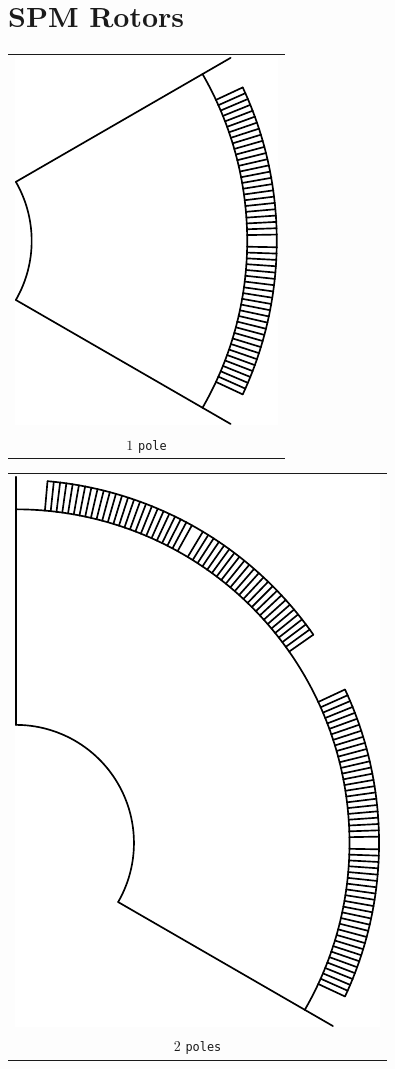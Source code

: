 \documentclass[a4paper,11pt,oneside]{report}
\begin{document}
\section{SPM Rotors}
\begin{tabular}{c}
\includegraphics[scale=0.75]{../examples/rotors/1pole} 
\\
$ 1 $ \texttt{pole}
\end{tabular}
\vspace{5mm}

\begin{tabular}{c}
\includegraphics[scale=0.75]{../examples/rotors/2pole} 
\\
$ 2 $ \texttt{poles}
\end{tabular}
\vspace{5mm}
\end{document}

